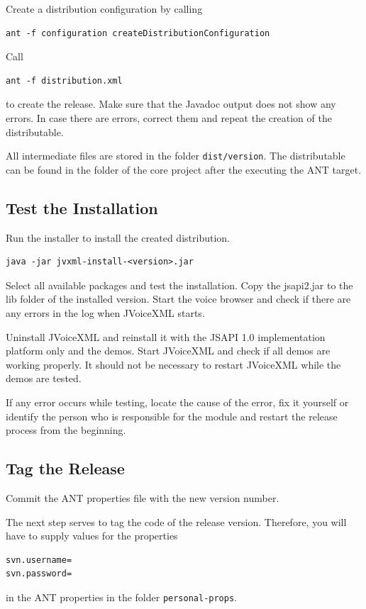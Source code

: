 \documentclass[11pt,a4paper]{article}
\begin{document}
Create a distribution configuration by calling
\begin{lstlisting}
ant -f configuration createDistributionConfiguration
\end{lstlisting}

Call
\begin{lstlisting}
ant -f distribution.xml
\end{lstlisting}
to create the release. Make sure that the Javadoc output does not show any
errors. In case there are errors, correct them and repeat the creation of the
distributable.

All intermediate files are stored in the folder \texttt{dist/version}. The
distributable can be found in the folder of the core project after the
executing the ANT target.

\subsection{Test the Installation}

Run the installer to install the created distribution.
\begin{lstlisting}
java -jar jvxml-install-<version>.jar
\end{lstlisting}
Select all available packages and test the installation. 
Copy the jsapi2.jar to the lib folder of the installed version.
Start the voice browser and check if there are any errors in the log when
JVoiceXML starts.

Uninstall JVoiceXML and reinstall it with the JSAPI 1.0 implementation platform
only and the demos. Start JVoiceXML and check if all demos are working properly.
It should not be necessary to restart JVoiceXML while the demos are tested.

If any error occurs while testing, locate the cause of the error, fix it
yourself or identify the person who is responsible for the module and restart
the release process from the beginning.

\subsection{Tag the Release}

Commit the ANT properties file with the new version number.

The next step serves to tag the code of the release version. Therefore, you
will have to supply values for the properties
\begin{lstlisting}
svn.username=
svn.password=
\end{lstlisting}
in the ANT properties in the folder \texttt{personal-props}.
\end{document}
